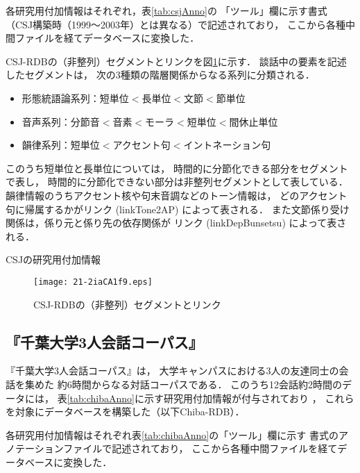 \documentclass[japanese]{jnlp_1.4}
\begin{document}
各研究用付加情報はそれぞれ，表\ref{tab:csjAnno}の
「ツール」欄に示す書式
（CSJ構築時（1999〜2003年）とは異なる）で記述されており，
ここから各種中間ファイルを経てデータベースに変換した．

CSJ-RDBの（非整列）セグメントとリンクを図\ref{fig:csjRdb}に示す．
談話中の要素を記述したセグメントは，
次の3種類の階層関係からなる系列に分類される．
\begin{itemize}
 \item 形態統語論系列：短単位$<$長単位$<$文節$<$節単位
 \item 音声系列：分節音$<$音素$<$モーラ$<$短単位$<$間休止単位
 \item 韻律系列：短単位$<$アクセント句$<$イントネーション句
\end{itemize}

このうち短単位と長単位については，
時間的に分節化できる部分をセグメントで表し，
時間的に分節化できない部分は非整列セグメントとして表している．
韻律情報のうちアクセント核や句末音調などのトーン情報は，
どのアクセント句に帰属するかがリンク (linkTone2AP) によって表される．
また文節係り受け関係は，係り元と係り先の依存関係が
リンク (linkDepBunsetsu) によって表される．

\begin{table}[t]
\caption{CSJの研究用付加情報}
\label{tab:csjAnno}

\end{table}

\begin{figure}[t]
\begin{center}
\texttt{[image: 21-2iaCA1f9.eps]}
\end{center}
\caption{CSJ-RDBの（非整列）セグメントとリンク}
\label{fig:csjRdb}
\end{figure}


\subsection{『千葉大学3人会話コーパス』}

『千葉大学3人会話コーパス』は，
大学キャンパスにおける3人の友達同士の会話を集めた
約6時間からなる対話コーパスである\cite{Den_2007_SAT}．
このうち12会話約2時間のデータには，
表\ref{tab:chibaAnno}に示す研究用付加情報が付与されており
    \cite{Den_2007_SAT,Den_2010_TAO,Den_2011_AOJ,Den_2012_AOR}，
これらを対象にデータベースを構築した（以下Chiba-RDB）．

各研究用付加情報はそれぞれ表\ref{tab:chibaAnno}の「ツール」欄に示す
書式のアノテーションファイルで記述されており，
ここから各種中間ファイルを経てデータベースに変換した．
\end{document}
